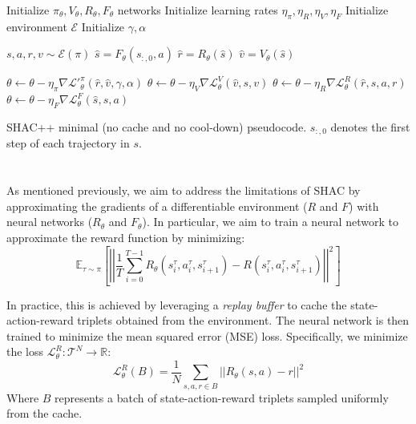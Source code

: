 \begin{algorithm}[t]
    \begin{algorithmic}[1]
    \STATE Initialize $\pi_\theta,V_\theta,R_\theta,F_\theta$ networks
    \STATE Initialize learning rates $\eta_\pi, \eta_R, \eta_V, \eta_F$
    \STATE Initialize environment $\mathcal{E}$
    \STATE Initialize $\gamma, \alpha$
    
        
        \STATE $s,a,r,v \sim \mathcal{E}(\pi)$
        \STATE $\hat{s} = F_\theta(s_{:,0}, a)$
        \STATE $\hat{r} = R_\theta(\hat{s})$
        \STATE $\hat{v} = V_\theta(\hat{s})$
        
        \STATE $\theta \gets \theta - \eta_\pi \nabla \mathcal{L'}^\pi_\theta(\hat{r},\hat{v},\gamma,\alpha)$
        \STATE $\theta \gets \theta - \eta_V \nabla \mathcal{L}^V_\theta(\hat{v},s,v)$
        \STATE $\theta \gets \theta - \eta_R \nabla \mathcal{L}^R_\theta(\hat{r},s,a,r)$
        \STATE $\theta \gets \theta - \eta_F \nabla \mathcal{L}^F_\theta(\hat{s},s,a)$
    
    \ENDFOR
    
    \end{algorithmic}
    \caption{SHAC++ minimal (no cache and no cool-down) pseudocode. $s_{:,0}$ denotes the first step of each trajectory in $s$.}
    \label{alg:shacpp}
\end{algorithm}


\section{\fname{}}

As mentioned previously, we aim to address the limitations of SHAC by approximating the gradients of a differentiable environment ($R$ and $F$) with neural networks ($R_\theta$ and $F_\theta$). In particular, we aim to train a neural network to approximate the reward function by minimizing: 
$$ \mathbb{E}_{\tau\sim\pi}\left[\left|\left| \frac{1}{T}\sum_{i=0}^{T-1} R_{\theta}(s_i^\tau, a_i^\tau, s_{i+1}^\tau) - R(s_i^\tau, a_i^\tau, s_{i+1}^\tau) \right|\right|^2\right] $$

In practice, this is achieved by leveraging a \emph{replay buffer} to cache the state-action-reward triplets obtained from the environment. The neural network is then trained to minimize the mean squared error (MSE) loss. Specifically, we minimize the loss $\mathcal{L}_\theta^{R}:\mathcal{T}^N\rightarrow\mathbb{R}$:
$$ \mathcal{L}_\theta^R(B) = \frac{1}{N}\sum_{s,a,r \in B}\left|\left| R_\theta(s, a) - r \right|\right|^2 $$
Where $B$ represents a batch of state-action-reward triplets sampled uniformly from the cache.

